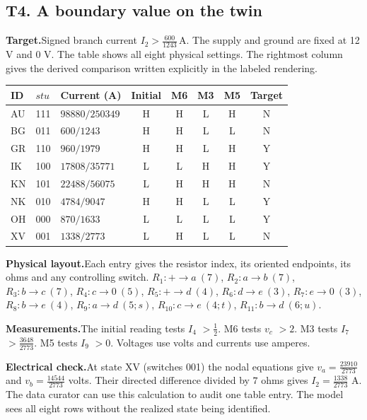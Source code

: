 \documentclass[12pt,letterpaper]{article}
\newcommand{\reading}[2]{\par\smallskip\textsf{\color{accent}\bfseries #1}\enspace #2\par}
\begin{document}
\clearpage{}\subsection*{T4. A boundary value on the twin}
\reading{Target.}{Signed branch current $I_{2}>\tfrac{600}{1243}\,\mathrm{A}$. The supply and ground are fixed at 12 V and 0 V. The table shows all eight physical settings. The rightmost column gives the derived comparison written explicitly in the labeled rendering.}

\begin{center}{\small\setlength{\tabcolsep}{4pt}\begin{tabularx}{\linewidth}{@{}llYccccc@{}}\toprule
ID & $stu$ & Current (A) & Initial & M6 & M3 & M5 & Target\\ \midrule
AU & 111 & $98880/250349$ & H & H & L & H & N\\
BG & 011 & $600/1243$ & H & H & L & L & N\\
GR & 110 & $960/1979$ & H & H & L & H & Y\\
IK & 100 & $17808/35771$ & L & L & H & H & Y\\
KN & 101 & $22488/56075$ & L & H & H & H & N\\
NK & 010 & $4784/9047$ & H & H & L & L & Y\\
OH & 000 & $870/1633$ & L & L & L & L & Y\\
XV & 001 & $1338/2773$ & L & H & L & L & N\\ \bottomrule\end{tabularx}}
\end{center}

\reading{Physical layout.}{Each entry gives the resistor index, its oriented endpoints, its ohms and any controlling switch. $R_{1}\colon +\to a\ (7)$, $R_{2}\colon a\to b\ (7)$, $R_{3}\colon b\to c\ (7)$, $R_{4}\colon c\to 0\ (5)$, $R_{5}\colon +\to d\ (4)$, $R_{6}\colon d\to e\ (3)$, $R_{7}\colon e\to 0\ (3)$, $R_{8}\colon b\to e\ (4)$, $R_{9}\colon a\to d\ (5;s)$, $R_{10}\colon c\to e\ (4;t)$, $R_{11}\colon b\to d\ (6;u)$.}

\reading{Measurements.}{The initial reading tests $I_{4}$ $>\tfrac{1}{2}$. M6 tests $v_{c}$ $>2$. M3 tests $I_{7}$ $>\tfrac{3648}{2773}$. M5 tests $I_{9}$ $>0$. Voltages use volts and currents use amperes.}

\reading{Electrical check.}{At state XV (switches 001) the nodal equations give $v_{a}=\tfrac{23910}{2773}$ and $v_{b}=\tfrac{14544}{2773}$ volts. Their directed difference divided by $7$ ohms gives $I_{2}=\tfrac{1338}{2773}$ A. The data curator can use this calculation to audit one table entry. The model sees all eight rows without the realized state being identified.}
\end{document}
